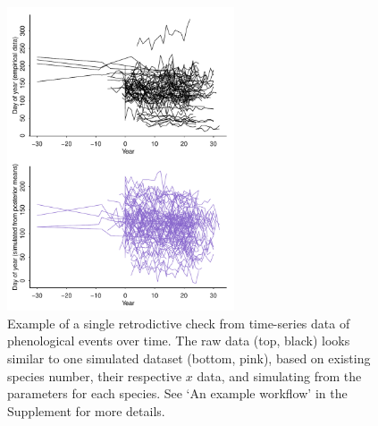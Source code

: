 \documentclass[11pt]{article}
\begin{document}
\begin{figure}[ht]
\centering
\noindent \includegraphics[width=0.6\textwidth]{examples/synchrony/graphs/rawvsonepredictivecheck.pdf}
\caption{Example of a single retrodictive check from time-series data of phenological events over time. The raw data (top, black) looks similar to one simulated dataset (bottom, pink), based on existing species number, their respective $x$ data, and simulating from the parameters for each species. See `An example workflow' in the Supplement for more details.}
\label{fig:retrodictivecheck}
\end{figure}
\end{document}
